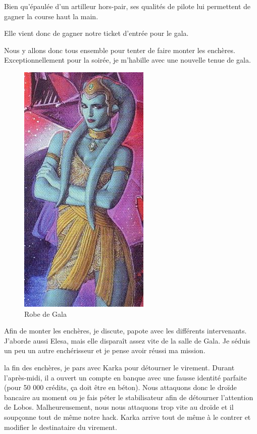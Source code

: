\documentclass[a4paper,9pt,twoside,twocolumn,openany]{book}
\begin{document}
Bien qu'épaulée d'un artilleur hors-pair, ses qualités de pilote lui permettent de gagner la course haut la main.

Elle vient donc de gagner notre ticket d'entrée pour le gala.

Nous y allons donc tous ensemble pour tenter de faire monter les enchères. Exceptionnellement pour la soirée, je m'habille avec une nouvelle tenue de gala.

\begin{figure}
    \includegraphics[width=0.5\columnwidth]{img/twilek_dress.jpg}
    \caption{Robe de Gala}
\end{figure}

Afin de monter les enchères, je discute, papote avec les différents intervenants. J'aborde aussi Elesa, mais elle disparaît assez vite de la salle de Gala. Je séduis un peu un autre enchérisseur et je pense avoir réussi ma mission.

\À la fin des enchères, je pars avec Karka pour détourner le virement. Durant l'après-midi, il a ouvert un compte en banque avec une fausse identité parfaite (pour 50 000 crédits, ça doit être en béton). Nous attaquons donc le droïde bancaire au moment ou je fais péter le stabilisateur afin de détourner l'attention de Lobos. Malheureusement, nous nous attaquons trop vite au droïde et il soupçonne tout de même notre hack. Karka arrive tout de même à le contrer et modifier le destinataire du virement.
\end{document}
